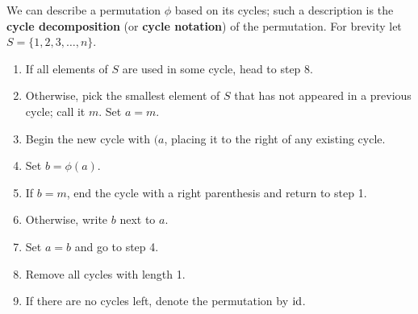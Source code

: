 We can describe a permutation $\phi$ based on its cycles; such a description is the \textbf{cycle decomposition} (or \textbf{cycle notation}) of the permutation. For brevity let $S = \{1, 2, 3, \dots, n\}$.
\begin{enumerate}
    \item If all elements of $S$ are used in some cycle, head to step 8.
    \item Otherwise, pick the smallest element of $S$ that has not appeared in a previous cycle; call it $m$. Set $a = m$.
    \item Begin the new cycle with $(a$, placing it to the right of any existing cycle.
    \item Set $b = \phi(a)$.
    \item If $b = m$, end the cycle with a right parenthesis and return to step 1.
    \item Otherwise, write $b$ next to $a$.
    \item Set $a = b$ and go to step 4.
    \item Remove all cycles with length 1.
    \item If there are no cycles left, denote the permutation by $\mathrm{id}$.
\end{enumerate}

\newpage

